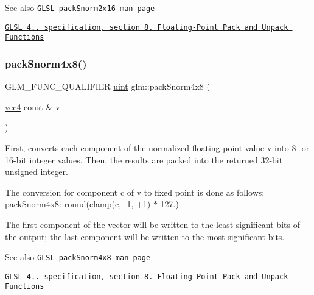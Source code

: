 \begin{DoxySeeAlso}{See also}
\href{http://www.opengl.org/sdk/docs/manglsl/xhtml/packSnorm2x16.xml}{\tt G\+L\+SL pack\+Snorm2x16 man page} 

\href{http://www.opengl.org/registry/doc/GLSLangSpec.4.20.8.pdf}{\tt G\+L\+SL 4.. specification, section 8. Floating-\/\+Point Pack and Unpack Functions} 
\end{DoxySeeAlso}
\mbox{\label{group__core__func__packing_gafcf25acc0d361c6c696a433aa5dfd16b}} 
\subsubsection{\texorpdfstring{pack\+Snorm4x8()}{packSnorm4x8()}}
{\footnotesize\ttfamily G\+L\+M\+\_\+\+F\+U\+N\+C\+\_\+\+Q\+U\+A\+L\+I\+F\+I\+ER \hyperlink{group__core__precision_ga4fd29415871152bfb5abd588334147c8}{uint} glm\+::pack\+Snorm4x8 (\begin{DoxyParamCaption}\item[{\hyperlink{group__core__types_ga5881b1b022d7fd1b7218f5916532dd02}{vec4} const \&}]{v }\end{DoxyParamCaption})}

First, converts each component of the normalized floating-\/point value v into 8-\/ or 16-\/bit integer values. Then, the results are packed into the returned 32-\/bit unsigned integer.

The conversion for component c of v to fixed point is done as follows\+: pack\+Snorm4x8\+: round(clamp(c, -\/1, +1) $\ast$ 127.)

The first component of the vector will be written to the least significant bits of the output; the last component will be written to the most significant bits.

\begin{DoxySeeAlso}{See also}
\href{http://www.opengl.org/sdk/docs/manglsl/xhtml/packSnorm4x8.xml}{\tt G\+L\+SL pack\+Snorm4x8 man page} 

\href{http://www.opengl.org/registry/doc/GLSLangSpec.4.20.8.pdf}{\tt G\+L\+SL 4.. specification, section 8. Floating-\/\+Point Pack and Unpack Functions} 
\end{DoxySeeAlso}
\mbox{\label{group__core__func__packing_ga0659ddaf09727551c7bf51655d2a65cf}} 
